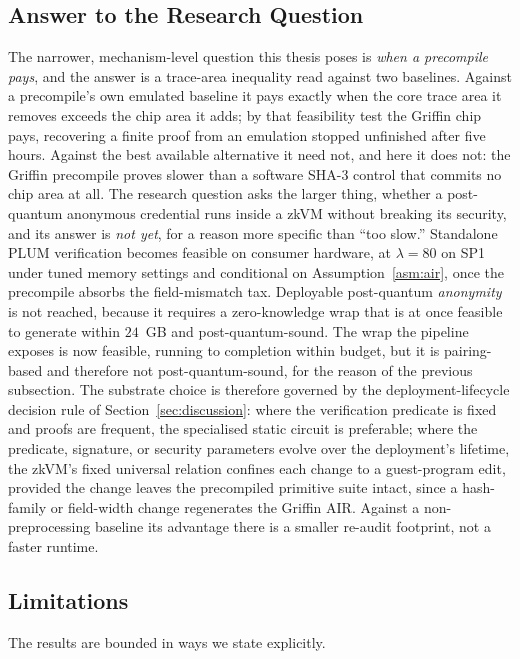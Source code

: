 \subsection{Answer to the Research Question}\label{subsec:conclusion-answer}
The narrower, mechanism-level question this thesis poses is \emph{when a precompile pays}, and the answer is a trace-area inequality read against two baselines. Against a precompile's own emulated baseline it pays exactly when the core trace area it removes exceeds the chip area it adds; by that feasibility test the Griffin chip pays, recovering a finite proof from an emulation stopped unfinished after five hours. Against the best available alternative it need not, and here it does not: the Griffin precompile proves slower than a software SHA-3 control that commits no chip area at all. The research question asks the larger thing, whether a post-quantum anonymous credential runs inside a zkVM without breaking its security, and its answer is \emph{not yet}, for a reason more specific than ``too slow.'' Standalone PLUM verification becomes feasible on consumer hardware, at $\lambda=80$ on SP1 under tuned memory settings and conditional on Assumption~\ref{asm:air}, once the precompile absorbs the field-mismatch tax. Deployable post-quantum \emph{anonymity} is not reached, because it requires a zero-knowledge wrap that is at once feasible to generate within $24$~GB and post-quantum-sound. The wrap the pipeline exposes is now feasible, running to completion within budget, but it is pairing-based and therefore not post-quantum-sound, for the reason of the previous subsection. The substrate choice is therefore governed by the deployment-lifecycle decision rule of Section~\ref{sec:discussion}: where the verification predicate is fixed and proofs are frequent, the specialised static circuit is preferable; where the predicate, signature, or security parameters evolve over the deployment's lifetime, the zkVM's fixed universal relation confines each change to a guest-program edit, provided the change leaves the precompiled primitive suite intact, since a hash-family or field-width change regenerates the Griffin AIR. Against a non-preprocessing baseline its advantage there is a smaller re-audit footprint, not a faster runtime.

\subsection{Limitations}\label{subsec:conclusion-limitations}
The results are bounded in ways we state explicitly.

